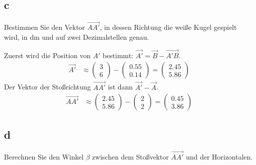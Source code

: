 \subsection{c}

Bestimmen Sie den Vektor \(\vec{AA'}\), in dessen Richtung die weiße Kugel
gespielt wird, in dm und auf zwei Dezimalstellen genau.

Zuerst wird die Position von \(A'\) bestimmt: \(\vec{A'} = \vec{B} -
\vec{A'B}\).
\begin{align*}
    \vec{A'} & \approx \begin{pmatrix} 3 \\ 6 \end{pmatrix} - \begin{pmatrix} 0.55 \\ 0.14 \end{pmatrix} = \begin{pmatrix} 2.45 \\ 5.86 \end{pmatrix}
\end{align*}
Der Vektor der Stoßrichtung \(\vec{AA'}\) ist dann \(\vec{A'} - \vec{A}\).
\begin{align*}
    \vec{AA'} & \approx \begin{pmatrix} 2.45 \\ 5.86 \end{pmatrix} - \begin{pmatrix} 2 \\ 2 \end{pmatrix} = \begin{pmatrix} 0.45 \\ 3.86 \end{pmatrix}
\end{align*}

\subsection{d}
Berechnen Sie den Winkel \(\beta\) zwischen dem Stoßvektor \(\vec{AA'}\) und
der Horizontalen.

